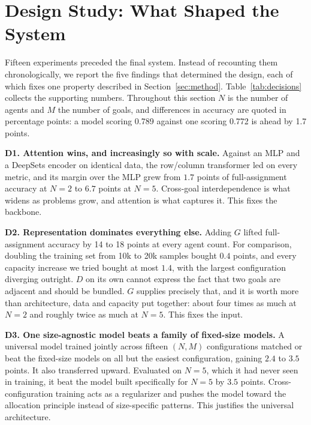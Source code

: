 \documentclass[11pt,a4paper]{article}
\begin{document}
\section{Design Study: What Shaped the System}
\label{sec:design}

Fifteen experiments preceded the final system. Instead of recounting them chronologically, we
report the five findings that determined the design, each of which fixes one property described in
Section~\ref{sec:method}. Table~\ref{tab:decisions} collects the supporting numbers. Throughout this
section $N$ is the number of agents and $M$ the number of goals, and differences in accuracy are
quoted in percentage points: a model scoring 0.789 against one scoring 0.772 is ahead by 1.7 points.

\textbf{D1. Attention wins, and increasingly so with scale.} Against an MLP and a DeepSets encoder
on identical data, the row/column transformer led on every metric, and its margin over the MLP grew
from $1.7$ points of full-assignment accuracy at $N{=}2$ to $6.7$ points at $N{=}5$. Cross-goal
interdependence is what widens as problems grow, and attention is what captures it. This fixes the
backbone.

\textbf{D2. Representation dominates everything else.} Adding $G$ lifted full-assignment accuracy
by 14 to 18 points at every agent count. For comparison, doubling the training set from 10k to 20k
samples bought $0.4$ points, and every capacity increase we tried bought at most $1.4$, with the
largest configuration diverging outright. $D$ on its own cannot express the fact that two goals are
adjacent and should be bundled. $G$ supplies precisely that, and it is worth more than architecture,
data and capacity put together: about four times as much at $N{=}2$ and roughly twice as much at
$N{=}5$. This fixes the input.

\textbf{D3. One size-agnostic model beats a family of fixed-size models.} A universal model trained
jointly across fifteen $(N,M)$ configurations matched or beat the fixed-size models on all but
the easiest configuration, gaining $2.4$ to $3.5$ points. It also transferred upward. Evaluated on
$N{=}5$, which it had never seen in training, it beat the model built specifically for $N{=}5$ by
$3.5$ points. Cross-configuration training acts as a regularizer and pushes the model toward the
allocation principle instead of size-specific patterns. This justifies the universal architecture.
\end{document}
